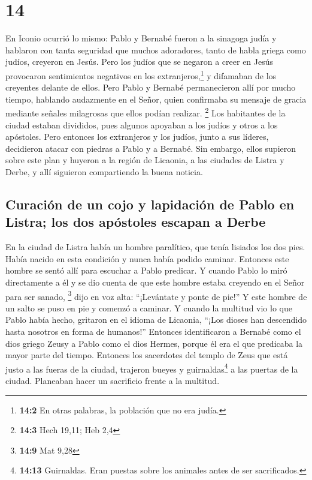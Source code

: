 \hypertarget{section-13}{%
\section{14}\label{section-13}}

 En Iconio ocurrió lo mismo: Pablo y Bernabé fueron a la
sinagoga judía y hablaron con tanta seguridad que muchos adoradores,
tanto de habla griega como judíos, creyeron en Jesús. 
Pero los judíos que se negaron a creer en Jesús provocaron sentimientos
negativos en los extranjeros,\footnote{\textbf{14:2} En otras palabras,
  la población que no era judía.} y difamaban de los creyentes delante
de ellos.  Pero Pablo y Bernabé permanecieron allí por
mucho tiempo, hablando audazmente en el Señor, quien confirmaba su
mensaje de gracia mediante señales milagrosas que ellos podían realizar.
\footnote{\textbf{14:3} Hech 19,11; Heb 2,4}  Los
habitantes de la ciudad estaban divididos, pues algunos apoyaban a los
judíos y otros a los apóstoles.  Pero entonces los
extranjeros y los judíos, junto a sus líderes, decidieron atacar con
piedras a Pablo y a Bernabé.  Sin embargo, ellos supieron
sobre este plan y huyeron a la región de Licaonia, a las ciudades de
Listra y Derbe,  y allí siguieron compartiendo la buena
noticia.

\hypertarget{curaciuxf3n-de-un-cojo-y-lapidaciuxf3n-de-pablo-en-listra-los-dos-apuxf3stoles-escapan-a-derbe}{%
\subsection{Curación de un cojo y lapidación de Pablo en Listra; los dos
apóstoles escapan a
Derbe}\label{curaciuxf3n-de-un-cojo-y-lapidaciuxf3n-de-pablo-en-listra-los-dos-apuxf3stoles-escapan-a-derbe}}

 En la ciudad de Listra había un hombre paralítico, que
tenía lisiados los dos pies. Había nacido en esta condición y nunca
había podido caminar.  Entonces este hombre se sentó allí
para escuchar a Pablo predicar. Y cuando Pablo lo miró directamente a él
y se dio cuenta de que este hombre estaba creyendo en el Señor para ser
sanado, \footnote{\textbf{14:9} Mat 9,28}  dijo en voz
alta: ``¡Levántate y ponte de pie!'' Y este hombre de un salto se puso
en pie y comenzó a caminar.  Y cuando la multitud vio lo
que Pablo había hecho, gritaron en el idioma de Licaonia, ``¡Los dioses
han descendido hasta nosotros en forma de humanos!'' 
Entonces identificaron a Bernabé como el dios griego Zeusy a Pablo como
el dios Hermes, porque él era el que predicaba la mayor parte del
tiempo.  Entonces los sacerdotes del templo de Zeus que
está justo a las fueras de la ciudad, trajeron bueyes y
guirnaldas\footnote{\textbf{14:13} Guirnaldas. Eran puestas sobre los
  animales antes de ser sacrificados.} a las puertas de la ciudad.
Planeaban hacer un sacrificio frente a la multitud.

